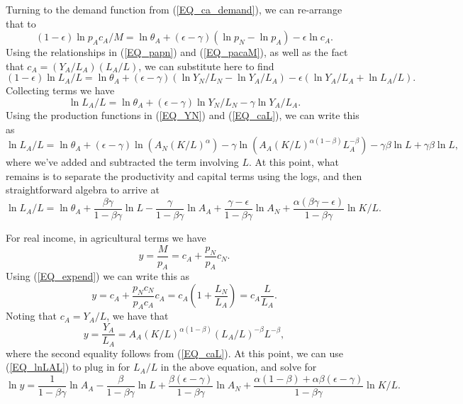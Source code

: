 \documentclass[11pt]{article}
\begin{document}
Turning to the demand function from (\ref{EQ_ca_demand}), we can re-arrange that to
\begin{equation}
   (1-\epsilon) \ln p_A c_A/M = \ln \theta_A  + (\epsilon-\gamma)(\ln p_N - \ln p_A) - \epsilon \ln c_A.
\end{equation}
Using the relationships in (\ref{EQ_papn}) and (\ref{EQ_pacaM}), as well as the fact that $c_A = (Y_A/L_A)(L_A/L)$, we can substitute here to find
\begin{equation}
    (1-\epsilon)\ln L_A/L = \ln \theta_A + (\epsilon-\gamma)\left(\ln Y_N/L_N - \ln Y_A/L_A \right) - \epsilon \left(\ln Y_A/L_A + \ln L_A/L \right).
\end{equation}
Collecting terms we have
\begin{equation}
    \ln L_A/L = \ln \theta_A + (\epsilon-\gamma) \ln Y_N/L_N - \gamma \ln Y_A/L_A.
\end{equation}
Using the production functions in (\ref{EQ_YN}) and (\ref{EQ_caL}), we can write this as
\begin{equation}
    \ln L_A/L = \ln \theta_A + (\epsilon-\gamma) \ln \left(A_N (K/L)^{\alpha}\right) - \gamma \ln \left(A_A (K/L)^{\alpha(1-\beta)} L_A^{-\beta}\right) - \gamma \beta \ln L + \gamma \beta \ln L,
\end{equation}
where we've added and subtracted the term involving $L$. At this point, what remains is to separate the productivity and capital terms using the logs, and then straightforward algebra to arrive at
\begin{equation}
    \ln L_A/L = \ln \theta_A + \frac{\beta\gamma}{1-\beta\gamma} \ln L - \frac{\gamma}{1-\beta\gamma} \ln A_A + \frac{\gamma - \epsilon}{1-\beta\gamma} \ln A_N + \frac{\alpha(\beta\gamma - \epsilon)}{1-\beta\gamma} \ln K/L.
\end{equation}

For real income, in agricultural terms we have
\begin{equation}
    y = \frac{M}{p_A} = c_A + \frac{p_N}{p_A} c_N.
\end{equation}
Using (\ref{EQ_expend}) we can write this as
\begin{equation}
    y = c_A + \frac{p_N c_N}{p_A c_A}c_A = c_A \left(1 + \frac{L_N}{L_A}\right) = c_A \frac{L}{L_A}.
\end{equation}
Noting that $c_A = Y_A/L$, we have that
\begin{equation}
    y = \frac{Y_A}{L_A} = A_A (K/L)^{\alpha(1-\beta)} (L_A/L)^{-\beta} L^{-\beta},
\end{equation}
where the second equality follows from (\ref{EQ_caL}). At this point, we can use (\ref{EQ_lnLAL}) to plug in for $L_A/L$ in the above equation, and solve for 
\begin{equation}
    \ln y = \frac{1}{1-\beta\gamma} \ln A_A - \frac{\beta}{1-\beta\gamma} \ln L + \frac{\beta(\epsilon-\gamma)}{1-\beta\gamma} \ln A_N + \frac{\alpha(1-\beta) + \alpha\beta(\epsilon-\gamma)}{1-\beta\gamma} \ln K/L.
\end{equation}
\end{document}
